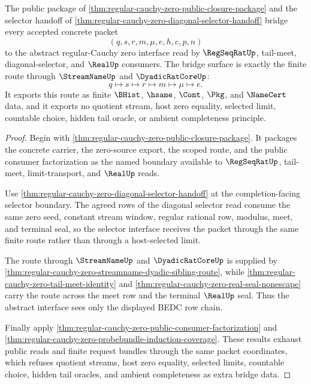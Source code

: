 \begin{theorem}
\label{thm:regular-cauchy-zero-abstract-bridge-surface}
The public package of
\autoref{thm:regular-cauchy-zero-public-closure-package} and the selector
handoff of \autoref{thm:regular-cauchy-zero-diagonal-selector-handoff}
bridge every accepted concrete packet
$$
(q,s,r,m,\mu,e,h,c,p,n)
$$
to the abstract regular-Cauchy zero interface read by $\RegSeqRatUp$,
tail-meet, diagonal-selector, and $\RealUp$ consumers. The bridge surface is
exactly the finite route through $\StreamNameUp$ and $\DyadicRatCoreUp$:
$$
q \mapsto s \mapsto r \mapsto m \mapsto \mu \mapsto e.
$$
It exports this route as finite $\BHist$, $\hsame$, $\Cont$, $\Pkg$, and
$\NameCert$ data, and it exports no quotient stream, host zero equality,
selected limit, countable choice, hidden tail oracle, or ambient completeness
principle.
\end{theorem}
\begin{proof}
Begin with \autoref{thm:regular-cauchy-zero-public-closure-package}. It
packages the concrete carrier, the zero-source export, the scoped route, and
the public consumer factorization as the named boundary available to
$\RegSeqRatUp$, tail-meet, limit-transport, and $\RealUp$ reads.

Use \autoref{thm:regular-cauchy-zero-diagonal-selector-handoff} at the
completion-facing selector boundary. The agreed rows of the diagonal selector
read consume the same zero seed, constant stream window, regular rational row,
modulus, meet, and terminal seal, so the selector interface receives the
packet through the same finite route rather than through a host-selected
limit.

The route through $\StreamNameUp$ and $\DyadicRatCoreUp$ is supplied by
\autoref{thm:regular-cauchy-zero-streamname-dyadic-sibling-route}, while
\autoref{thm:regular-cauchy-zero-tail-meet-identity} and
\autoref{thm:regular-cauchy-zero-real-seal-nonescape} carry the route across
the meet row and the terminal $\RealUp$ seal. Thus the abstract interface sees
only the displayed BEDC row chain.

Finally apply
\autoref{thm:regular-cauchy-zero-public-consumer-factorization} and
\autoref{thm:regular-cauchy-zero-probebundle-induction-coverage}. These
results exhaust public reads and finite request bundles through the same
packet coordinates, which refuses quotient streams, host zero equality,
selected limits, countable choice, hidden tail oracles, and ambient
completeness as extra bridge data.
\end{proof}

